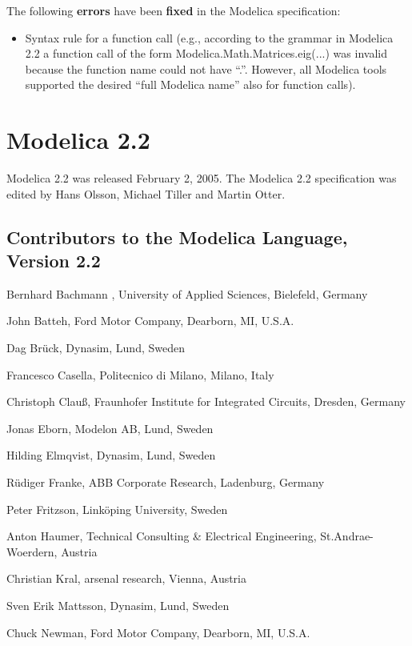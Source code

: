 \documentclass[10pt,a4paper]{report}
\def\doublelabel#1{\label{#1}}
\begin{document}
The following \textbf{errors} have been \textbf{fixed} in the Modelica
specification:

\begin{itemize}
\item
  Syntax rule for a function call (e.g., according to the grammar in
  Modelica 2.2 a function call of the form
  Modelica.Math.Matrices.eig(...) was invalid because the function name
  could not have ``.''. However, all Modelica tools supported the
  desired ``full Modelica name'' also for function calls).
\end{itemize}

\section{Modelica 2.2}\doublelabel{modelica-2-2}

Modelica 2.2 was released February 2, 2005. The Modelica 2.2
specification was edited by Hans Olsson, Michael Tiller and Martin
Otter.

\subsection{Contributors to the Modelica Language, Version 2.2}\doublelabel{contributors-to-the-modelica-language-version-2-2}
\indent\indent
Bernhard Bachmann , University of Applied Sciences, Bielefeld, Germany

John Batteh, Ford Motor Company, Dearborn, MI, U.S.A.

Dag Brück, Dynasim, Lund, Sweden

Francesco Casella, Politecnico di Milano, Milano, Italy

Christoph Clauß, Fraunhofer Institute for Integrated Circuits, Dresden,
Germany

Jonas Eborn, Modelon AB, Lund, Sweden

Hilding Elmqvist, Dynasim, Lund, Sweden

Rüdiger Franke, ABB Corporate Research, Ladenburg, Germany

Peter Fritzson, Linköping University, Sweden

Anton Haumer, Technical Consulting \& Electrical Engineering,
St.Andrae-Woerdern, Austria

Christian Kral, arsenal research, Vienna, Austria

Sven Erik Mattsson, Dynasim, Lund, Sweden

Chuck Newman, Ford Motor Company, Dearborn, MI, U.S.A.
\end{document}
